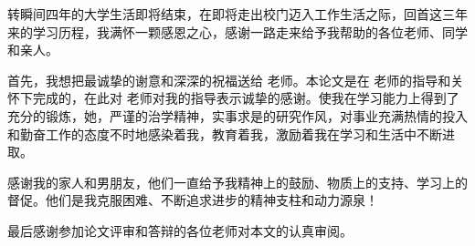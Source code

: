 \documentclass{XDBAthesis}
\begin{document}
\else
\fi
\begin{thanks}
转瞬间四年的大学生活即将结束，在即将走出校门迈入工作生活之际，回首这三年来的学习历程，我满怀一颗感恩之心，感谢一路走来给予我帮助的各位老师、同学和亲人。

首先，我想把最诚挚的谢意和深深的祝福送给 老师。本论文是在 老师的指导和关怀下完成的，在此对 老师对我的指导表示诚挚的感谢。使我在学习能力上得到了充分的锻炼，她，严谨的治学精神，实事求是的研究作风，对事业充满热情的投入和勤奋工作的态度不时地感染着我，教育着我，激励着我在学习和生活中不断进取。

感谢我的家人和男朋友，他们一直给予我精神上的鼓励、物质上的支持、学习上的督促。他们是我克服困难、不断追求进步的精神支柱和动力源泉！

最后感谢参加论文评审和答辩的各位老师对本文的认真审阅。
\end{thanks}
\ifx\allfiles\undefined
%

\end{document}
